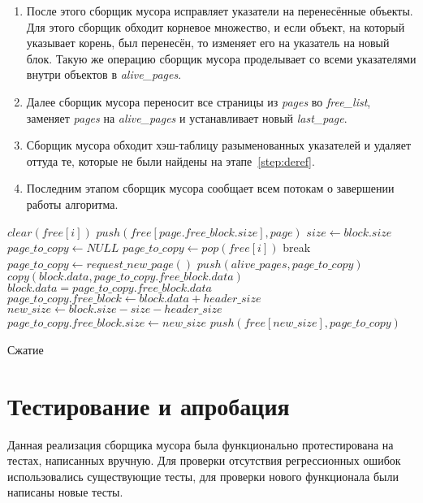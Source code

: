 \begin{enumerate}
\item После этого сборщик мусора исправляет указатели на перенесённые объекты. Для этого сборщик обходит корневое множество, и если объект, на который указывает корень, был перенесён, то изменяет его на указатель на новый блок. Такую же операцию сборщик мусора проделывает со всеми указателями внутри объектов в \textit{alive\_pages}.
\item Далее сборщик мусора переносит все страницы из \textit{pages} во \textit{free\_list}, заменяет \textit{pages} на \textit{alive\_pages} и устанавливает новый \textit{last\_page}.
\item Сборщик мусора обходит хэш-таблицу разыменованных указателей и удаляет оттуда те, которые не были найдены на этапе~\ref{step:deref}.
\item Последним этапом сборщик мусора сообщает всем потокам о завершении работы алгоритма. 
\end{enumerate}

\begin{algorithm}
\begin{algorithmic}[1]
    \State $clear(free[i])$
\EndFor
{}
    \State $push(free[page.free\_block.size], page)$
\EndFor
{}
            \State $size \gets block.size$
            \State $page\_to\_copy \gets NULL$
                    \State $page\_to\_copy \gets pop(free[i])$
                    \State break
                \EndIf
            \EndFor
                \State $page\_to\_copy \gets request\_new\_page()$
                \State $push(alive\_pages, page\_to\_copy)$
            \EndIf
            \State $copy(block.data, page\_to\_copy.free\_block.data)$
            \State $block.data = page\_to\_copy.free\_block.data$
            \State $page\_to\_copy.free\_block \gets block.data + header\_size$
            \State $new\_size \gets block.size - size - header\_size$
            \State $page\_to\_copy.free\_block.size \gets new\_size$
            \State $push(free[new\_size], page\_to\_copy)$
        \EndIf
    \EndFor
\EndFor

\end{algorithmic}
\caption{Сжатие}\label{alg:copy}
\end{algorithm}

\section{Тестирование и апробация}
Данная реализация сборщика мусора была функционально протестирована на тестах, написанных вручную. Для проверки отсутствия регрессионных ошибок использовались существующие тесты, для проверки нового функционала были написаны новые тесты.

